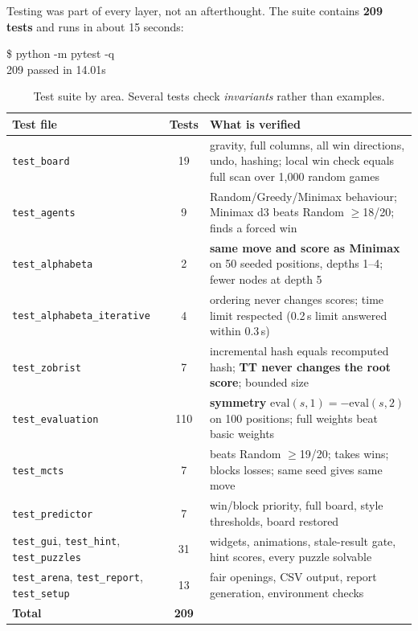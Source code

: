 \documentclass[11pt,a4paper]{article}
\newcommand{\code}[1]{\texttt{\small #1}}
\begin{document}
Testing was part of every layer, not an afterthought. The suite contains \textbf{209 tests} and runs in about 15 seconds:

\begin{center}
\begin{tcolorbox}[enhanced,colback=ink,colframe=ink,arc=3pt,width=0.62\textwidth,left=10pt,boxrule=0pt]
\color{white}\ttfamily\small \$ python -m pytest -q\\
\color{good!60!white}209 passed\color{white} in 14.01s
\end{tcolorbox}
\end{center}

\begin{table}[ht]
\centering\small
\caption{Test suite by area. Several tests check \emph{invariants} rather than examples.}\label{tab:tests}
\begin{tabularx}{\textwidth}{@{}l c Y@{}}
\toprule
\textbf{Test file} & \textbf{Tests} & \textbf{What is verified} \\
\midrule
\code{test\_board} & 19 & gravity, full columns, all win directions, undo, hashing; local win check equals full scan over 1{,}000 random games \\
\code{test\_agents} & 9 & Random/Greedy/Minimax behaviour; Minimax d3 beats Random $\ge$18/20; finds a forced win \\
\code{test\_alphabeta} & 2 & \textbf{same move and score as Minimax} on 50 seeded positions, depths 1--4; fewer nodes at depth 5 \\
\code{test\_alphabeta\_iterative} & 4 & ordering never changes scores; time limit respected (0.2\,s limit answered within 0.3\,s) \\
\code{test\_zobrist} & 7 & incremental hash equals recomputed hash; \textbf{TT never changes the root score}; bounded size \\
\code{test\_evaluation} & 110 & \textbf{symmetry} $\text{eval}(s,1)=-\text{eval}(s,2)$ on 100 positions; full weights beat basic weights \\
\code{test\_mcts} & 7 & beats Random $\ge$19/20; takes wins; blocks losses; same seed gives same move \\
\code{test\_predictor} & 7 & win/block priority, full board, style thresholds, board restored \\
\code{test\_gui}, \code{test\_hint}, \code{test\_puzzles} & 31 & widgets, animations, stale-result gate, hint scores, every puzzle solvable \\
\code{test\_arena}, \code{test\_report}, \code{test\_setup} & 13 & fair openings, CSV output, report generation, environment checks \\
\midrule
\textbf{Total} & \textbf{209} & \\
\bottomrule
\end{tabularx}
\end{table}
\end{document}
